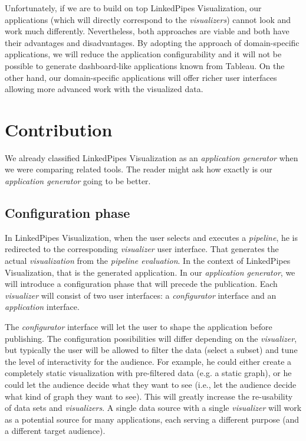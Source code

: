 Unfortunately, if we are to build on top LinkedPipes Visualization, our applications (which will directly correspond to the \emph{visualizers}) cannot look and work much differently. Nevertheless, both approaches are viable and both have their advantages and disadvantages. By adopting the approach of domain-specific applications, we will reduce the application configurability and it will not be possible to generate dashboard-like applications known from Tableau. On the other hand, our domain-specific applications will offer richer user interfaces allowing more advanced work with the visualized data.

\section{Contribution}

We already classified LinkedPipes Visualization as an \emph{application generator} when we were comparing related tools. The reader might ask how exactly is our \emph{application generator} going to be better. 

\subsection{Configuration phase}

In LinkedPipes Visualization, when the user selects and executes a \emph{pipeline}, he is redirected to the corresponding \emph{visualizer} user interface. That generates the actual \emph{visualization} from the \emph{pipeline evaluation}. In the context of LinkedPipes Visualization, that is the generated application. In our \emph{application generator}, we will introduce a configuration phase that will precede the publication. Each \emph{visualizer} will consist of two user interfaces: a \emph{configurator} interface and an \emph{application} interface. 

The \emph{configurator} interface will let the user to shape the application before publishing. The configuration possibilities will differ depending on the \emph{visualizer}, but typically the user will be allowed to filter the data (select a subset) and tune the level of interactivity for the audience. For example, he could either create a completely static visualization with pre-filtered data (e.g. a static graph), or he could let the audience decide what they want to see (i.e., let the audience decide what kind of graph they want to see). This will greatly increase the re-usability of data sets and \emph{visualizers}. A single data source with a single \emph{visualizer} will work as a potential source for many applications, each serving a different purpose (and a different target audience).

